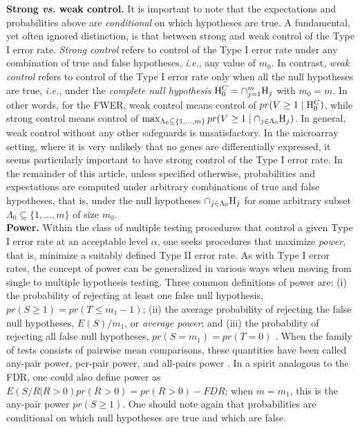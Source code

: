 \documentclass[11pt]{article}
\begin{document}
{\bf Strong {\it vs.} weak control.} It is important to note that the
expectations and probabilities above are {\it conditional} on which
hypotheses are true. A fundamental,
yet often ignored distinction, is that between strong and weak control
of the Type I error rate. {\it Strong control} refers to control of
the Type I error rate under any combination of true and false
hypotheses, {\it i.e.}, any value of $m_0$. In contrast, {\it weak
  control} refers to control of the Type I error rate only when all
the null hypotheses are true, {\it i.e.}, under the {\it complete null
  hypothesis} ${\rm H}_0^C = \cap_{j=1}^m {\rm H}_j$ with $m_0=m$. In
other words, for the FWER, weak control means control of $pr(V\geq 1
\mid {\rm H}_0^C)$, while strong control means control of $\max_{\Lambda_0
  \subseteq \{1, \ldots, m\}} pr(V\geq 1 \mid \cap_{j \in \Lambda_0} {\rm
  H}_j)$. In general, weak control without any other safeguards is
unsatisfactory. In the microarray setting, where it is very unlikely
that no genes are differentially expressed, it seems
particularly important to have strong control of the Type I error
rate.  In the remainder of this article, unless specified otherwise,
 probabilities and expectations are computed under arbitrary combinations
of true and false hypotheses, that is, under the null hypotheses $\cap_{j \in \Lambda_0} {\rm
  H}_j$ for some arbitrary subset $\Lambda_0 \subseteq \{1, \ldots,
m\}$ of size $m_0$.\\

{\bf Power.} Within the class of multiple testing procedures that
control a given Type I error rate at an acceptable level $\alpha$, one
seeks procedures that maximize {\it power}, that is, minimize a
suitably defined Type II error rate. As with Type I error rates, the
concept of power can be generalized in various ways when moving from
single to multiple hypothesis testing. Three common definitions of
power are: (i) the probability of rejecting at least one false null
hypothesis, $pr(S \geq 1) = pr(T \leq m_1-1)$; (ii) the average
probability of rejecting the false null hypotheses, $E(S)/m_1$, or {\it
  average power}; and (iii) the probability of rejecting all false
null 
hypotheses, $pr(S=m_1) = pr(T=0)$ \citep{Shaffer95}. When the family of
tests consists of pairwise mean comparisons, these quantities have
been called any-pair power, per-pair power, and all-pairs power
\citep{Ramsey78}. In a spirit analogous to the FDR, one
could also define power as $E(S/R|R>0)pr(R>0) = pr(R>0)-FDR$; when $m=m_1$, this is
the any-pair power $pr(S \geq 1)$. One should note again that
probabilities are conditional on which null hypotheses are true and
which are false.\\
\end{document}
